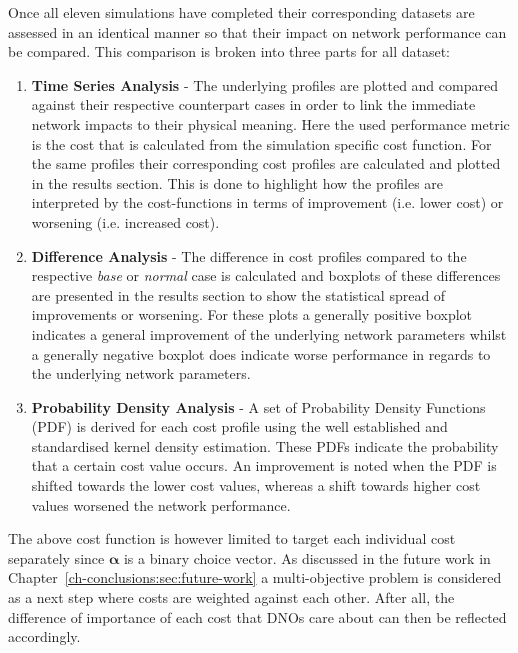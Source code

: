 Once all eleven simulations have completed their corresponding datasets are assessed in an identical manner so that their impact on network performance can be compared.
This comparison is broken into three parts for all dataset:

\begin{enumerate}
	\item \textbf{Time Series Analysis} - 
	The underlying profiles are plotted and compared against their respective counterpart cases in order to link the immediate network impacts to their physical meaning.
	Here the used performance metric is the cost that is calculated from the simulation specific cost function.
	For the same profiles their corresponding cost profiles are calculated and plotted in the results section.
	This is done to highlight how the profiles are interpreted by the cost-functions in terms of improvement (i.e. lower cost) or worsening (i.e. increased cost).
	\item \textbf{Difference Analysis} - 
	The difference in cost profiles compared to the respective \textit{base} or \textit{normal} case is calculated and boxplots of these differences are presented in the results section to show the statistical spread of improvements or worsening.
	For these plots a generally positive boxplot indicates a general improvement of the underlying network parameters whilst a generally negative boxplot does indicate worse performance in regards to the underlying network parameters.
	\item \textbf{Probability Density Analysis} - 
	A set of Probability Density Functions (PDF) is derived for each cost profile using the well established and standardised kernel density estimation.
	These PDFs indicate the probability that a certain cost value occurs.
	An improvement is noted when the PDF is shifted towards the lower cost values, whereas a shift towards higher cost values worsened the network performance.
\end{enumerate}

The above cost function is however limited to target each individual cost separately since $\boldsymbol{\alpha}$ is a binary choice vector.
As discussed in the future work in Chapter~\ref{ch-conclusions:sec:future-work} a multi-objective problem is considered as a next step where costs are weighted against each other.
After all, the difference of importance of each cost that DNOs care about can then be reflected accordingly.




